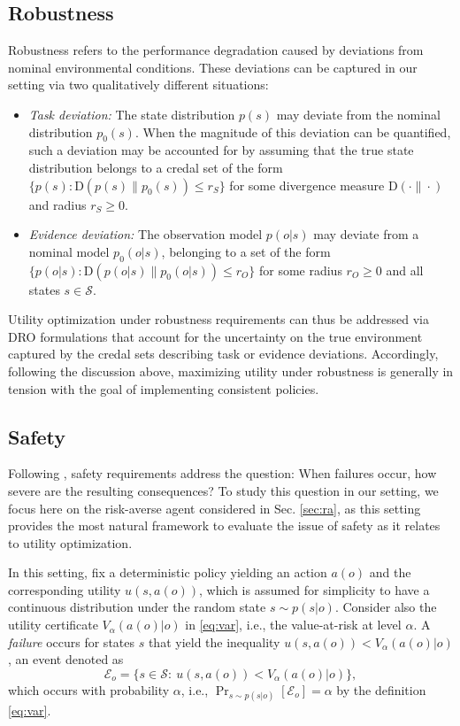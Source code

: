 \documentclass[journal]{IEEEtran}
\theoremstyle{definition}
\theoremstyle{remark}
\begin{document}
{\subsection{Robustness}
Robustness refers to the performance degradation caused by deviations from nominal environmental conditions. These deviations can be captured in our setting via two qualitatively different situations:
\begin{itemize}
\item \emph{Task deviation:} The state distribution $p(s)$ may deviate from the nominal distribution $p_0(s)$. When the magnitude of this deviation can be quantified, such a deviation may be accounted for by assuming that the true state distribution belongs to a credal set of the form $\{p(s):\mathrm{D}(p(s)\|p_0(s))\leq r_S\}$ for some divergence measure $\mathrm{D}(\cdot\|\cdot)$ and radius $r_S\geq 0$.
\item \emph{Evidence deviation:} The observation model $p(o|s)$ may deviate from a nominal model $p_0(o|s)$, belonging to a set of the form $\{p(o|s):\mathrm{D}(p(o|s)\|p_0(o|s))\leq r_O\}$ for some radius $r_O \geq 0$ and all states $s\in\mathcal{S}$.
\end{itemize}
Utility optimization under robustness requirements can thus be addressed via DRO formulations that account for the uncertainty on the true environment captured by the credal sets describing task or evidence deviations. Accordingly, following the discussion above, maximizing utility under robustness is generally in tension with the goal of implementing consistent policies.

\subsection{Safety}
Following \cite{rabanser2026towards}, safety requirements address the question: When failures occur, how severe are the resulting consequences? To study this question in our setting, we focus here on the risk-averse agent considered in Sec. \ref{sec:ra}, as this setting provides the most natural framework to evaluate the issue of safety as it relates to utility optimization.

In this setting, fix a deterministic policy yielding an action $a(o)$ and the corresponding utility $u(s,a(o))$, which is assumed for simplicity to have a continuous distribution under the random state  $s\sim p(s|o)$. Consider also the utility certificate $V_{\alpha}(a(o)|o)$ in \eqref{eq:var}, i.e., the value-at-risk at level $\alpha$. A \emph{failure} occurs for states $s$ that yield the inequality $u(s,a(o))<V_{\alpha}(a(o)|o)$, an event denoted as
%
\begin{equation}
  \mathcal{E}_{o}=\bigl\{s\in\mathcal{S}:\ u(s,a(o))<V_{\alpha}(a(o)|o)\bigr\},
  \label{eq:failure_event}
\end{equation}
%
which occurs with probability $\alpha$, i.e., $\Pr_{s\sim p(s|o)}[\mathcal{E}_{o}]=\alpha$ by the definition \eqref{eq:var}.

}
\end{document}
